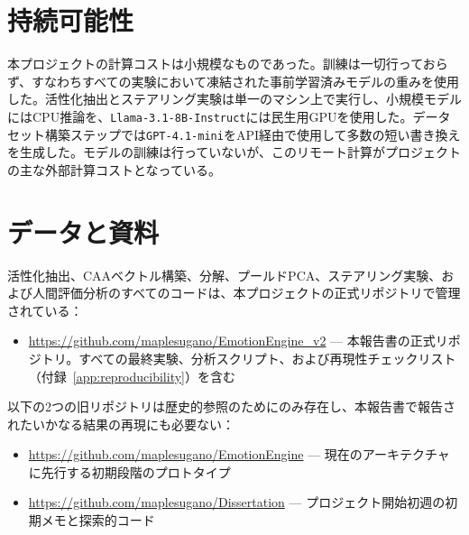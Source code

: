 \section*{持続可能性}

本プロジェクトの計算コストは小規模なものであった。訓練は一切行っておらず、すなわちすべての実験において凍結された事前学習済みモデルの重みを使用した。活性化抽出とステアリング実験は単一のマシン上で実行し、小規模モデルにはCPU推論を、\texttt{Llama-3.1-8B-Instruct}には民生用GPUを使用した。データセット構築ステップでは\texttt{GPT-4.1-mini}をAPI経由で使用して多数の短い書き換えを生成した。モデルの訓練は行っていないが、このリモート計算がプロジェクトの主な外部計算コストとなっている。
\section*{データと資料}

活性化抽出、CAAベクトル構築、分解、プールドPCA、ステアリング実験、および人間評価分析のすべてのコードは、本プロジェクトの正式リポジトリで管理されている：

\begin{itemize}
    \item \url{https://github.com/maplesugano/EmotionEngine_v2} --- 本報告書の正式リポジトリ。すべての最終実験、分析スクリプト、および再現性チェックリスト（付録~\ref{app:reproducibility}）を含む
\end{itemize}

以下の2つの旧リポジトリは歴史的参照のためにのみ存在し、本報告書で報告されたいかなる結果の再現にも必要ない：
\begin{itemize}
    \item \url{https://github.com/maplesugano/EmotionEngine} --- 現在のアーキテクチャに先行する初期段階のプロトタイプ
    \item \url{https://github.com/maplesugano/Dissertation} --- プロジェクト開始初週の初期メモと探索的コード
\end{itemize}
